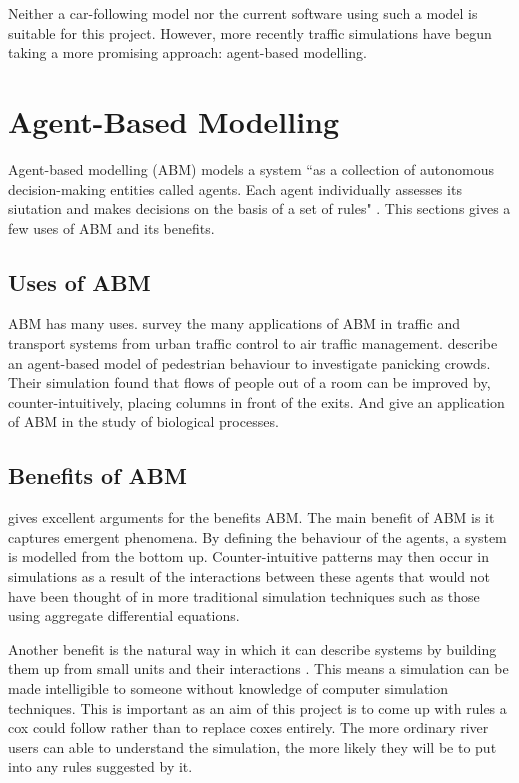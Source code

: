     Neither a car-following model nor the current software using such a model is suitable for this project. However, more recently traffic simulations have begun taking a more promising approach: agent-based modelling.
      
    \section{Agent-Based Modelling}
    Agent-based modelling (ABM) models a system ``as a collection of autonomous decision-making entities called agents. Each agent individually assesses its siutation and makes decisions on the basis of a set of rules" \cite{Bonabeau2002}. This sections gives a few uses of ABM and its benefits.
    
    \subsection{Uses of ABM}
    ABM has many uses. \textcite{Chen2010} survey the many applications of ABM in traffic and transport systems from urban traffic control to air traffic management. \textcite{Helbing2000} describe an agent-based model of pedestrian behaviour to investigate panicking crowds. Their simulation found that flows of people out of a room can be improved by, counter-intuitively, placing columns in front of the exits. And \textcite{Miller2010} give an application of ABM in the study of biological processes.
    
    \subsection{Benefits of ABM}
      \textcite{Bonabeau2002} gives excellent arguments for the benefits ABM. The main benefit of ABM is it captures emergent phenomena. By defining the behaviour of the agents, a system is modelled from the bottom up. Counter-intuitive patterns may then occur in simulations as a result of the interactions between these agents that would not have been thought of in more traditional simulation techniques such as those using aggregate differential equations.
      
      Another benefit is the natural way in which it can describe systems by building them up from small units and their interactions \cite{Bonabeau2002}. This means a simulation can be made intelligible to someone without knowledge of computer simulation techniques. This is important as an aim of this project is to come up with rules a cox could follow rather than to replace coxes entirely. The more ordinary river users can able to understand the simulation, the more likely they will be to put into any rules suggested by it.
    
